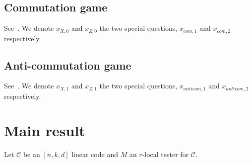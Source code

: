 \documentclass[11pt]{article}
\theoremstyle{definition}
\newcommand{\code}{\mathcal{C}}
\begin{document}
\subsection{Commutation game}

See~\cite[Section 3.1]{de2022spectral}. We denote $x_{X,0}$ and $x_{Z,0}$ the two special questions, $x_{com,1}$ and $x_{com,2}$ respectively. 

\subsection{Anti-commutation game}

See~\cite[Section 3.2]{de2022spectral}. We denote $x_{X,1}$ and $x_{Z,1}$ the two special questions, $x_{anticom,1}$ and $x_{anticom,2}$ respectively. 

\section{Main result}

Let $\code$ be an $[n,k,d]$ linear code and $M$ an $r$-local tester for $\code$. 
\end{document}
